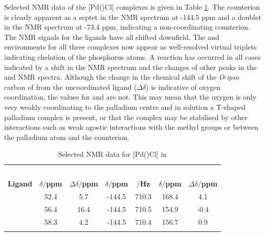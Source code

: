 Selected NMR data of the [Pd(\tBuxantphosk)Cl] complexes is given in Table \ref{table:PdPF6NMR}.  The  counterion is clearly apparent as a septet in the \phosphorus{} NMR spectrum at -144.5 ppm and a doublet in the \fluorine{} NMR spectrum at -73.4 ppm, indicating a non-coordinating counterion.  The \phosphorus{} NMR signals for the \tBuxantphos{} ligands have all shifted downfield.  The \tBu{} \proton{} and \carbon{} environments for all three complexes now appear as well-resolved virtual triplets indicating \trans{} chelation of the phosphorus atoms.  A reaction has occurred in all cases indicated by a shift in the \phosphorus{} NMR spectrum and the changes of other peaks in the \proton{} and \carbon{} NMR spectra.  Although the change in the chemical shift of the \emph{O}-\emph{ipso} carbon of \tBusixantphos{} from the uncoordinated ligand ($\Delta\delta$) is indicative of oxygen coordination, the values for \tButhixantphos{} and \tBuxantphos{} are not.  This may mean that the oxygen is only very weakly coordinating to the palladium centre and in solution a T-shaped palladium complex is present, or that the complex may be stabilised by other interactions such as weak agostic interactions with the \tBu{} methyl groups or between the palladium atom and the  counterion.  

\begin{table}[htbp]
\caption[Selected NMR data for [Pd(\tBuxantphos)Cl{]} complexes]{Selected NMR data for [Pd(\tBuxantphos)Cl] in }
\label{table:PdPF6NMR}
\small
\begin{center}
\begin{tabular}{l c c c c c c}
	\toprule{}
	~~ & \multicolumn{4}{c}{\bfseries{\phosphorus}} & \multicolumn{2}{c}{\bfseries{\carbon}}\\
	\cmidrule(lr){2-5} \cmidrule(lr){6-7}
	\bfseries{Ligand}&\bfseries{$\delta/$ppm}&\bfseries{$\Delta\delta/$ppm}& \bfseries{$\delta/$ppm} & \bfseries{\JPF$/$Hz} & \bfseries{$\delta/$ppm}&\bfseries{$\Delta\delta/$ppm}\\
	\midrule
	\tBuSixantphos		& 52.4	& 5.7		& -144.5	& 710.3	& 168.4	& 4.1	\\
	\tBuThixantphos 	& 56.4	& 16.4	& -144.5	& 710.5	& 154.9	& -0.4	\\
	\tBuXantphos		& 58.3	& 4.2		& -144.5	& 710.4	& 156.7	& 0.9 \\
	\bottomrule{}
\end{tabular}
\end{center}
\end{table}

